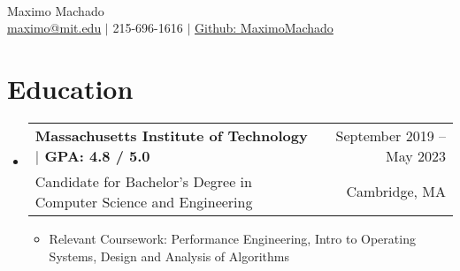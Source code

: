 \documentclass[letterpaper,12pt]{article} %
\makeatletter
\newcommand{\CVItem}[1]{
  \item\small{
    {#1 \vspace{-2pt}}
  }
}
\newcommand{\CVSubheading}[4]{
  \vspace{-2pt}\item
    \begin{tabular*}{0.97\textwidth}[t]{l@{\extracolsep{\fill}}r}
      \textbf{#1} & #2 \\
      \small#3 & \small #4 \\
    \end{tabular*}\vspace{-7pt}
}
\newcommand{\CVSubHeadingListStart}{\begin{itemize}[leftmargin=0.15in, label={}]} %
\newcommand{\CVSubHeadingListEnd}{\end{itemize}}
\newcommand{\CVItemListStart}{\begin{itemize}}
\newcommand{\CVItemListEnd}{\end{itemize}\vspace{-5pt}}
\makeatother
\begin{document}

\begin{minipage}[c]{0.05\textwidth}
  \-\
\end{minipage}

\begin{center}
  \Huge Maximo Machado \\ \vspace{1pt} %
  \small
  \href{mailto:maximo@mit.edu}{maximo@mit.edu} $|$
  215-696-1616 $|$
  \href{https://github.com/MaximoMachado}{Github: MaximoMachado}
\end{center}
\vspace{-10pt} %

\section{Education}
\CVSubHeadingListStart
\CVSubheading
{{Massachusetts Institute of Technology $|$ \small{GPA: 4.8 / 5.0}}}{September 2019 -- May 2023}
{Candidate for Bachelor's Degree in Computer Science and Engineering}{Cambridge, MA}

\CVItemListStart
\CVItem{Relevant Coursework:
  Performance Engineering,
  Intro to Operating Systems,
  Design and Analysis of Algorithms
  }
\CVItemListEnd
\CVSubHeadingListEnd

\vspace{-10pt} %
\end{document}
